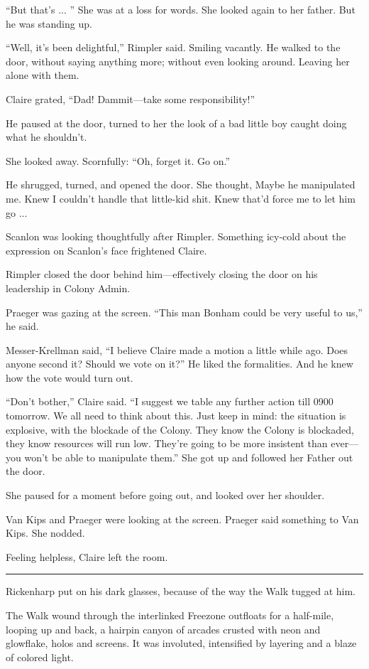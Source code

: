 ``But that's ... '' She was at a loss for words. She looked again to her father. But he was standing up.

``Well, it's been delightful,'' Rimpler said. Smiling vacantly. He walked to the door, without saying anything more; without even looking around. Leaving her alone with them.

Claire grated, ``Dad! Dammit---take some responsibility!''

He paused at the door, turned to her the look of a bad little boy caught doing what he shouldn't.

She looked away. Scornfully: ``Oh, forget it. Go on.''

He shrugged, turned, and opened the door. She thought, Maybe he manipulated me. Knew I couldn't handle that little-kid shit. Knew that'd force me to let him go ...

Scanlon was looking thoughtfully after Rimpler. Something icy-cold about the expression on Scanlon's face frightened Claire.

Rimpler closed the door behind him---effectively closing the door on his leadership in Colony Admin.

Praeger was gazing at the screen. ``This man Bonham could be very useful to us,'' he said.

Messer-Krellman said, ``I believe Claire made a motion a little while ago. Does anyone second it? Should we vote on it?'' He liked the formalities. And he knew how the vote would turn out.

``Don't bother,'' Claire said. ``I suggest we table any further action till 0900 tomorrow. We all need to think about this. Just keep in mind: the situation is explosive, with the blockade of the Colony. They know the Colony is blockaded, they know resources will run low. They're going to be more insistent than ever---you won't be able to manipulate them.'' She got up and followed her Father out the door.

She paused for a moment before going out, and looked over her shoulder.

Van Kips and Praeger were looking at the screen. Praeger said something to Van Kips. She nodded.

Feeling helpless, Claire left the room.

\fancybreak{* * *}

Rickenharp put on his dark glasses, because of the way the Walk tugged at him.

The Walk wound through the interlinked Freezone outfloats for a half-mile, looping up and back, a hairpin canyon of arcades crusted with neon and glowflake, holos and screens. It was involuted, intensified by layering and a blaze of colored light.

